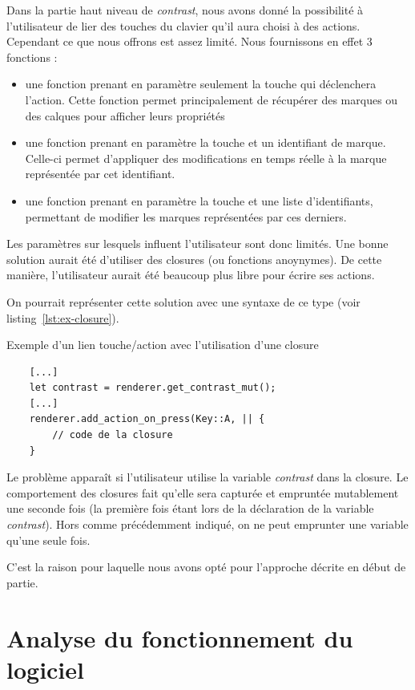 \documentclass[12pt]{article}
\begin{document}
Dans la partie haut niveau de \textit{contrast}, nous avons donné la possibilité à
l'utilisateur de lier des touches du clavier qu'il aura choisi à des actions.
Cependant ce que nous offrons est assez limité. Nous fournissons en effet 3 fonctions :
\begin{itemize}
\item une fonction prenant en paramètre seulement la touche qui déclenchera l'action.
Cette fonction permet principalement de récupérer des marques ou des calques pour
afficher leurs propriétés
\item une fonction prenant en paramètre la touche et un identifiant de marque. Celle-ci
permet d'appliquer des modifications en temps réelle à la marque représentée par cet
identifiant.
\item une fonction prenant en paramètre la touche et une liste d'identifiants, permettant de modifier les marques représentées par ces derniers.
\end{itemize}

Les paramètres sur lesquels influent l'utilisateur sont donc limités.
Une bonne solution aurait été d'utiliser des closures (ou fonctions anoynymes). De cette
manière, l'utilisateur aurait été beaucoup plus libre pour écrire ses actions.

On pourrait représenter cette solution avec une syntaxe de ce type
(voir listing~\ref{lst:ex-closure}).
\begin{listing}[H]
    \caption{Exemple d'un lien touche/action avec l'utilisation d'une closure}
    \begin{verbatim}
    [...]
    let contrast = renderer.get_contrast_mut();
    [...]
    renderer.add_action_on_press(Key::A, || {
        // code de la closure
    }
    \end{verbatim}
    \label{lst:ex-closure}
\end{listing}

Le problème apparaît si l'utilisateur utilise la variable \textit{contrast} dans la
closure. Le comportement des closures fait qu'elle sera capturée et empruntée
mutablement une seconde fois (la première fois étant lors de la déclaration de la
variable \textit{contrast}). Hors comme précédemment indiqué, on ne peut emprunter une
variable qu'une seule fois.

C'est la raison pour laquelle nous avons opté pour l'approche décrite en début de
partie.

\section{Analyse du fonctionnement du logiciel}
\end{document}
